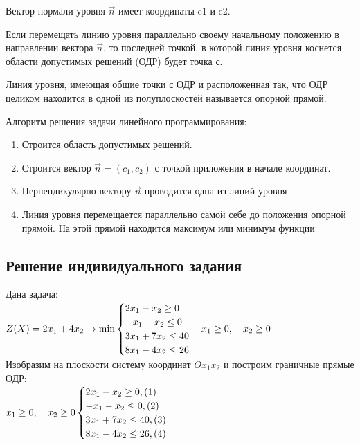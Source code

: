 \documentclass[a4paper, 12pt]{article}
\begin{document}
Вектор нормали уровня $\vec{n}$ имеет координаты c1 и c2.

Если перемещать линию уровня параллельно своему начальному положению в направлении вектора $\vec{n}$, то последней точкой, в которой линия уровня коснется области допустимых решений (ОДР) будет точка с.

Линия уровня, имеющая общие точки с ОДР и расположенная так, что ОДР целиком находится в одной из полуплоскостей называется опорной прямой.

Алгоритм решения задачи линейного программирования:
\begin{enumerate}
	\item Строится область допустимых решений.
	\item Строится вектор $\vec{n}= (c_1, c_2)$ с точкой приложения в начале координат.
	\item Перпендикулярно вектору $\vec{n}$ проводится одна из линий уровня
	\item Линия уровня перемещается параллельно самой себе до положения опорной прямой. На этой прямой находится максимум или минимум функции
\end{enumerate}

\subsection{Решение индивидуального задания}
Дана задача:\\

\begin{math}
  Z(X)=2x_1+4x_2 \rightarrow  \text{min} \\
  \begin{cases}
    2x_1-x_2 \geq 0\\
    -x_1-x_2 \leq 0\\
    3x_1+7x_2 \leq 40\\
    8x_1-4x_2 \leq 26\\
  \end{cases}\\
  x_1\geq 0, \quad x_2\geq 0
\end{math}\\

Изобразим на плоскости систему координат $Ox_1x_2$ и построим граничные прямые ОДР:\\

\begin{math}
  x_1\geq 0, \quad x_2\geq 0\\
  \begin{cases}
    2x_1-x_2 \geq 0,(1)\\
    -x_1-x_2 \leq 0,(2)\\
    3x_1+7x_2 \leq 40,(3)\\
    8x_1-4x_2 \leq 26,(4)\\
  \end{cases}\\
\end{math}\\
\end{document}
